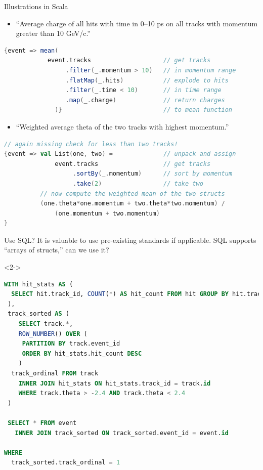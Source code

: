\documentclass{beamer}
\begin{document}
\begin{frame}[fragile]{Illustrations in Scala}
\vspace{0.35 cm}
\begin{itemize}
\item ``Average charge of all hits with time in 0--10 ps on all tracks with momentum greater than 10 GeV/c.''
\end{itemize}

\begin{lstlisting}[language=scala]
{event => mean(
            event.tracks                    // get tracks
                 .filter(_.momentum > 10)   // in momentum range
                 .flatMap(_.hits)           // explode to hits
                 .filter(_.time < 10)       // in time range
                 .map(_.charge)             // return charges
              )}                            // to mean function
\end{lstlisting}

\begin{itemize}
\item ``Weighted average theta of the two tracks with highest momentum.''
\end{itemize}

\begin{lstlisting}[language=scala]
// again missing check for less than two tracks!
{event => val List(one, two) =              // unpack and assign
              event.tracks                  // get tracks
                   .sortBy(_.momentum)      // sort by momentum
                   .take(2)                 // take two
          // now compute the weighted mean of the two structs
          (one.theta*one.momentum + two.theta*two.momentum) /
              (one.momentum + two.momentum)
}\end{lstlisting}
\end{frame}

\begin{frame}[fragile]{Use SQL?}
\vspace{0.3 cm}
It is valuable to use pre-existing standards if applicable. SQL supports ``arrays of structs,'' can we use it? 

\begin{uncoverenv}<2->
\begin{lstlisting}[language=sql, basicstyle=\ttfamily\scriptsize]
 WITH hit_stats AS (
  SELECT hit.track_id, COUNT(*) AS hit_count FROM hit GROUP BY hit.track_id
 ),
 track_sorted AS (
    SELECT track.*, 
    ROW_NUMBER() OVER (
     PARTITION BY track.event_id
     ORDER BY hit_stats.hit_count DESC
    )
  track_ordinal FROM track 
    INNER JOIN hit_stats ON hit_stats.track_id = track.id
    WHERE track.theta > -2.4 AND track.theta < 2.4
 )

 SELECT * FROM event
   INNER JOIN track_sorted ON track_sorted.event_id = event.id

WHERE
  track_sorted.track_ordinal = 1
\end{lstlisting}
\end{uncoverenv}
\end{frame}
\end{document}
